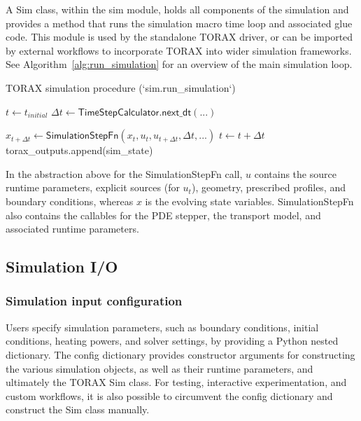 \documentclass[aps, reprint, nofootinbib]{revtex4-2}
\begin{document}
A \textsf{Sim} class, within the sim module, holds all components of the simulation and provides a method that runs the simulation macro time loop and associated glue code. This module is used by the standalone TORAX driver, or can be imported by external workflows to incorporate TORAX into wider simulation frameworks. See Algorithm~\ref{alg:run_simulation} for an overview of the main simulation loop.
\begin{algorithm}[H]
\caption{TORAX simulation procedure (`sim.run\_simulation`)}
\label{alg:run_simulation}
\begin{algorithmic}[1]
\State $t \gets t_{initial}$  
\State $\Delta t \gets \textsf{TimeStepCalculator.next\_dt}(...)$  

\State $x_{t+\Delta t} \gets \textsf{SimulationStepFn}(x_t, u_t, u_{t+\Delta t}, \Delta t, ...)$ 
\State $t \gets t + \Delta t$   
\State \textsf{torax\_outputs.append(sim\_state})  
\EndWhile
\end{algorithmic}
\end{algorithm}

In the abstraction above for the \textsf{SimulationStepFn} call, $u$ contains the source runtime parameters, explicit sources (for $u_t$), geometry, prescribed profiles, and boundary conditions, whereas $x$ is the evolving state variables. \textsf{SimulationStepFn} also contains the callables for the PDE stepper, the transport model, and associated runtime parameters. 

\subsection{Simulation I/O}

\subsubsection{Simulation input configuration}
Users specify simulation parameters, such as boundary conditions, initial conditions, heating powers, and solver settings, by providing a Python nested dictionary. The config dictionary provides constructor arguments for constructing the various simulation objects, as well as their runtime parameters, and ultimately the TORAX \textsf{Sim} class. For testing, interactive experimentation, and custom workflows, it is also possible to circumvent the config dictionary and construct the \textsf{Sim} class manually.
\end{document}
